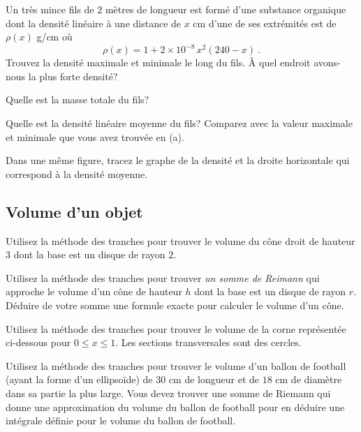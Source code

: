 \begin{question}[\life]
Un très mince fils de $2$ mètres de longueur est formé d'une substance
organique dont la densité linéaire à une distance de $x$ cm d'une de
ses extrémités est de $\rho(x)$ g/cm où
\[
\rho(x) = 1 + 2 \times 10^{-8}\, x^2(240-x) \ .
\]
 Trouvez la densité maximale et minimale le long du fils.  À quel
endroit avons-nous la plus forte densité?

 Quelle est la masse totale du fils?

 Quelle est la densité linéaire moyenne du fils?  Comparez avec la
valeur maximale et minimale que vous avez trouvée en (a).

 Dans une même figure, tracez le graphe de la densité et la droite
horizontale qui correspond à la densité moyenne.
\label{8Q8}
\end{question}

\subsection{Volume d'un objet}

\begin{question}[\eng]
Utilisez la méthode des tranches pour trouver le volume du cône droit
de hauteur $3$ dont la base est un disque de rayon $2$.
\label{8Q9}
\end{question}

\begin{question}[\eng]
Utilisez la méthode des tranches pour trouver {\em un somme de Reimann}
qui approche le volume d'un cône de hauteur $h$ dont la base est un
disque de rayon $r$.  Déduire de votre somme une formule exacte pour
calculer le volume d'un cône.
\label{8Q10}
\end{question}

\begin{question}[\eng]
Utilisez la méthode des tranches pour trouver le volume de la corne
représentée ci-dessous pour $0\leq x \leq 1$.  Les
sections transversales sont des cercles.
\label{8Q11}
\end{question}

\begin{question}[\eng]
Utilisez la méthode des tranches pour trouver le volume d'un ballon de
football (ayant la forme d'un ellipsoïde) de $30$ cm de longueur et de
$18$ cm de diamètre dans sa partie la plus large.  Vous devez trouver
une somme de Riemann qui donne une approximation du volume du ballon
de football pour en déduire une intégrale définie pour le volume du
ballon de football.
\label{8Q12}
\end{question}

